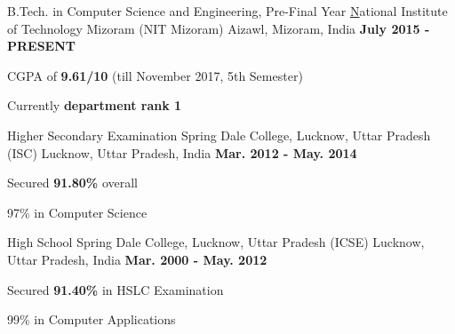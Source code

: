 \begin{cventries}
  \cventry
    {B.Tech. in Computer Science and Engineering, Pre-Final Year}
    {\href{http://nitmz.ac.in/} National Institute of Technology Mizoram (NIT Mizoram)}
    {Aizawl, Mizoram, India}
    {\textbf{July 2015 - PRESENT}}
    {
      \begin{cvitems}
        \item {CGPA of \textbf{9.61/10} (till November 2017, 5th Semester)}
        \item {Currently \textbf{department rank 1}}
      \end{cvitems}
    }
\cventry
    {Higher Secondary Examination}
    {Spring Dale College, Lucknow, Uttar Pradesh (ISC)}
    {Lucknow, Uttar Pradesh, India}
    {\textbf{Mar. 2012 - May. 2014}}
    {
      \begin{cvitems}
        \item {Secured \textbf{91.80\%} overall}
        \item {97\% in Computer Science}
      \end{cvitems}
    }
 \cventry
    {High School}
    {Spring Dale College, Lucknow, Uttar Pradesh (ICSE)}
    {Lucknow, Uttar Pradesh, India}
    {\textbf{Mar. 2000 - May. 2012}}
    {
      \begin{cvitems}
        \item {Secured \textbf{91.40\%} in HSLC Examination}
        \item {99\% in Computer Applications}
      \end{cvitems}
    }
\end{cventries}